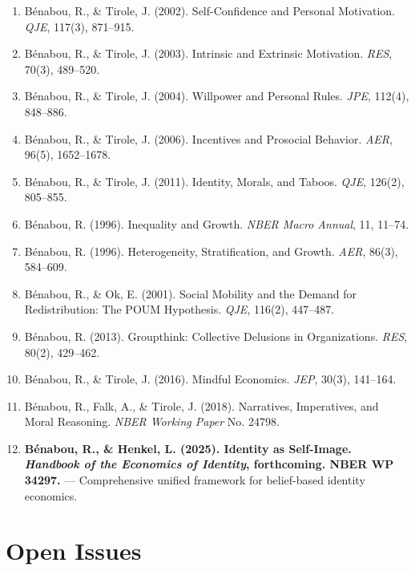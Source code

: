 \begin{enumerate}
    \item Bénabou, R., \& Tirole, J. (2002). Self-Confidence and Personal Motivation. \textit{QJE}, 117(3), 871--915.
    \item Bénabou, R., \& Tirole, J. (2003). Intrinsic and Extrinsic Motivation. \textit{RES}, 70(3), 489--520.
    \item Bénabou, R., \& Tirole, J. (2004). Willpower and Personal Rules. \textit{JPE}, 112(4), 848--886.
    \item Bénabou, R., \& Tirole, J. (2006). Incentives and Prosocial Behavior. \textit{AER}, 96(5), 1652--1678.
    \item Bénabou, R., \& Tirole, J. (2011). Identity, Morals, and Taboos. \textit{QJE}, 126(2), 805--855.
    \item Bénabou, R. (1996). Inequality and Growth. \textit{NBER Macro Annual}, 11, 11--74.
    \item Bénabou, R. (1996). Heterogeneity, Stratification, and Growth. \textit{AER}, 86(3), 584--609.
    \item Bénabou, R., \& Ok, E. (2001). Social Mobility and the Demand for Redistribution: The POUM Hypothesis. \textit{QJE}, 116(2), 447--487.
    \item Bénabou, R. (2013). Groupthink: Collective Delusions in Organizations. \textit{RES}, 80(2), 429--462.
    \item Bénabou, R., \& Tirole, J. (2016). Mindful Economics. \textit{JEP}, 30(3), 141--164.
    \item Bénabou, R., Falk, A., \& Tirole, J. (2018). Narratives, Imperatives, and Moral Reasoning. \textit{NBER Working Paper} No. 24798.
    \item \textbf{Bénabou, R., \& Henkel, L. (2025). Identity as Self-Image. \textit{Handbook of the Economics of Identity}, forthcoming. NBER WP 34297.} --- Comprehensive unified framework for belief-based identity economics.
\end{enumerate}

\section{Open Issues}
\label{sec:rb-open}

